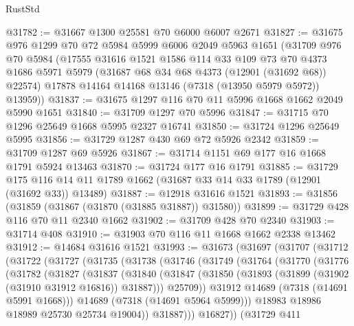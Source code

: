 \begin{lexlean}{RustStd}
\begin{coremodule}
@31782 := @31667 @1300 @25581 @70 @6000 @6007 @2671
@31827 := @31675
    @976
    @1299
    @70
    @72
    @5984
    @5999
    @6006
    @2049
    @5963
    @1651
    (@31709
      @976
      @70
      @5984
      (@17555
        @31616
        @1521
        @1586
        @114
        @33
        @109
        @73
        @70
        @4373
        @1686
        @5971
        @5979
        (@31687 @68 @34 @68 @4373 (@12901 (@31692 @68)) @22574)
        @17878
        @14164
        @14168
        @13146
        (@7318 (@13950 @5979 @5972))
        @13959))
@31837 := @31675 @1297 @116 @70 @11 @5996 @1668 @1662 @2049 @5990 @1651
@31840 := @31709 @1297 @70 @5996
@31847 := @31715 @70 @1296 @25649 @1668 @5995 @2327 @16741
@31850 := @31724 @1296 @25649 @5995
@31856 := @31729 @1287 @430 @69 @72 @5926 @2342
@31859 := @31709 @1287 @69 @5926
@31867 := @31714 @1151 @69 @177 @16 @1668 @1791 @5924 @13463
@31870 := @31724 @177 @16 @1791
@31885 := @31729
    @175
    @116
    @14
    @11
    @1789
    @1662
    (@31687 @33 @14 @33 @1789 (@12901 (@31692 @33)) @13489)
@31887 := @12918 @31616 @1521
@31893 := @31856 (@31859 (@31867 (@31870 (@31885 @31887)) @31580))
@31899 := @31729 @428 @116 @70 @11 @2340 @1662
@31902 := @31709 @428 @70 @2340
@31903 := @31714 @408
@31910 := @31903 @70 @116 @11 @1668 @1662 @2338 @13462
@31912 := @14684 @31616 @1521
@31993 := @31673
    (@31697
      (@31707
        (@31712
          (@31722
            (@31727
              (@31735
                (@31738
                  (@31746
                    (@31749
                      (@31764
                        (@31770
                          (@31776
                            (@31782
                              (@31827
                                (@31837
                                  (@31840
                                    (@31847
                                      (@31850
                                        (@31893 (@31899 (@31902 (@31910 @31912 @16816)) @31887)))
                                      @25709))
                                  @31912
                                  @14689
                                  (@7318 (@14691 @5991 @1668)))
                                @14689
                                (@7318 (@14691 @5964 @5999)))
                              @18983
                              @18986
                              @18989
                              @25730
                              @25734
                              @19004))
                          @31887)))
                    @16827))
                (@31729
                  @411

\end{coremodule}
\end{lexlean}
